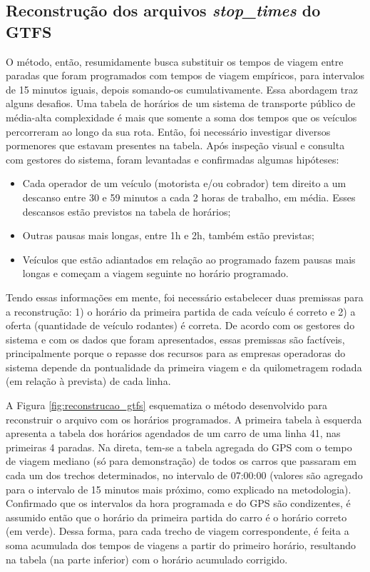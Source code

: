 \documentclass[        
    a4paper,          %
    12pt,             %
    chapter=TITLE,    %
    section=Title,    %
    subsection=Title, %
    oneside,          %
    english,          %
    spanish,          %
    brazil,           %
    fleqn             %
]{abntex2}
\begin{document}
  \hypertarget{reconstrucao-dos-arquivos-stop_times-do-gtfs}{%
  \subsection{\texorpdfstring{Reconstrução dos arquivos \emph{stop\_times} do GTFS}{Reconstrução dos arquivos stop\_times do GTFS}}\label{reconstrucao-dos-arquivos-stop_times-do-gtfs}}
  
  O método, então, resumidamente busca substituir os tempos de viagem entre paradas que foram programados com tempos de viagem empíricos, para intervalos de 15 minutos iguais, depois somando-os cumulativamente. Essa abordagem traz alguns desafios. Uma tabela de horários de um sistema de transporte público de média-alta complexidade é mais que somente a soma dos tempos que os veículos percorreram ao longo da sua rota. Então, foi necessário investigar diversos pormenores que estavam presentes na tabela. Após inspeção visual e consulta com gestores do sistema, foram levantadas e confirmadas algumas hipóteses:
  
  \begin{itemize}
  \tightlist
  \item
    Cada operador de um veículo (motorista e/ou cobrador) tem direito a um descanso entre 30 e 59 minutos a cada 2 horas de trabalho, em média. Esses descansos estão previstos na tabela de horários;
  \item
    Outras pausas mais longas, entre 1h e 2h, também estão previstas;
  \item
    Veículos que estão adiantados em relação ao programado fazem pausas mais longas e começam a viagem seguinte no horário programado.
  \end{itemize}
  
  Tendo essas informações em mente, foi necessário estabelecer duas premissas para a reconstrução: 1) o horário da primeira partida de cada veículo é correto e 2) a oferta (quantidade de veículo rodantes) é correta. De acordo com os gestores do sistema e com os dados que foram apresentados, essas premissas são factíveis, principalmente porque o repasse dos recursos para as empresas operadoras do sistema depende da pontualidade da primeira viagem e da quilometragem rodada (em relação à prevista) de cada linha.
  
  A Figura \ref{fig:reconstrucao_gtfs} esquematiza o método desenvolvido para reconstruir o arquivo com os horários programados. A primeira tabela à esquerda apresenta a tabela dos horários agendados de um carro de uma linha 41, nas primeiras 4 paradas. Na direta, tem-se a tabela agregada do GPS com o tempo de viagem mediano (só para demonstração) de todos os carros que passaram em cada um dos trechos determinados, no intervalo de 07:00:00 (valores são agregado para o intervalo de 15 minutos mais próximo, como explicado na metodologia). Confirmado que os intervalos da hora programada e do GPS são condizentes, é assumido então que o horário da primeira partida do carro é o horário correto (em verde). Dessa forma, para cada trecho de viagem correspondente, é feita a soma acumulada dos tempos de viagens a partir do primeiro horário, resultando na tabela (na parte inferior) com o horário acumulado corrigido.
  
\end{document}
